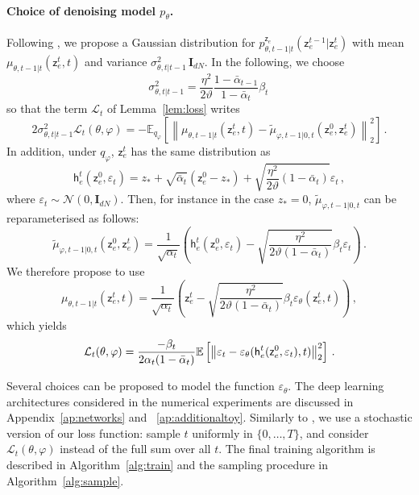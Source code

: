 \documentclass[nolayout]{article}
\theoremstyle{plain}
\theoremstyle{definition}
\theoremstyle{remark}
\newcommand{\latentcont}{\mathsf{z}_e}
\newcommand{\latentcontpred}{\mathsf{h}_e}
\begin{document}
\paragraph{Choice of denoising model $p_\theta$.}
Following \cite{ho2020denoising}, we propose a Gaussian distribution for $p_{\theta,t-1|t}^{\latentcont}(\latentcont^{t-1}|\latentcont^{t})$ with mean $\mu_{\theta,t-1|t}(\latentcont^{t},t)$ and variance $\sigma_{\theta,t|t-1}^2\,\mathbf{I}_{dN}$. In the following, we choose $$
\sigma_{\theta,t|t-1}^2 = \frac{\eta^2}{2\vartheta}\frac{1- \bar \alpha_{t-1}}{1- \bar \alpha_{t}}\beta_t\,
$$
so that the term $\mathcal{L}_t$ of Lemma~\ref{lem:loss} writes
$$
    2\sigma_{\theta,t|t-1}^2\mathcal{L}_t(\theta,\varphi)   = -\mathbb{E}_{q_\varphi}\left[\left\|\mu_{\theta,t-1|t}(\latentcont^{t},t) -  \tilde \mu_{\varphi,t-1|0,t}(\latentcont^0,\latentcont^t)\right\|_2^2\right]\,.
$$
In addition, under $q_\varphi$, $\latentcont^t$ has the same distribution as
$$
\latentcontpred^t(\latentcont^{0},\varepsilon_t) = z_* + \sqrt{\bar \alpha_t}(\latentcont^{0}-z_*) + \sqrt{\frac{\eta^2}{2\vartheta}(1-\bar\alpha_t)}\varepsilon_t\,,
$$
where $\varepsilon_t \sim \mathcal{N}(0,\mathbf{I}_{dN})$. Then, for instance in the case $z_*=0$, $\tilde \mu_{\varphi,t-1|0,t}$ can be reparameterised as follows:
$$
    \tilde \mu_{\varphi,t-1|0,t}(\latentcont^0,\latentcont^t) =  \frac{1}{\sqrt{\alpha_t}}\left(\latentcontpred^t(\latentcont^0,\varepsilon_t) - \sqrt{\frac{\eta^2}{2\vartheta (1-\bar{\alpha}_t)}}\beta_t\varepsilon_t\right)\,.
$$
We therefore propose to use
$$
    \mu_{\theta,t-1|t}(\latentcont^{t},t) =
     \frac{1}{\sqrt{\alpha_t}}\left(\latentcont^t - \sqrt{\frac{\eta^2}{2\vartheta (1-\bar{\alpha}_t)}}\beta_t\varepsilon_\theta(\latentcont^{t},t)\right)\,,
$$
which yields
\begin{equation}
    \label{eq:hoparam}
    \mathcal{L}_t(\theta,\varphi) \\
    = \frac{-\beta_t}{2\alpha_t(1-\bar\alpha_t)}\mathbb{E}\left[\left\|\varepsilon_t - \varepsilon_\theta(\latentcontpred^t(\latentcont^{0},\varepsilon_t) ,t) \right\|_2^2\right]\,.
\end{equation}
    
Several choices can be proposed to model the function $\varepsilon_\theta$. The deep learning architectures considered in the numerical experiments are discussed in Appendix~\ref{ap:networks} and ~\ref{ap:additionaltoy}. Similarly to \cite{ho2020denoising}, we use a stochastic version of our loss function:  sample $t$ uniformly in $\{0, \ldots,  T\}$, and consider $\mathcal{L}_t(\theta,\varphi)$ instead of the full sum over all $t$. The final training algorithm is described in Algorithm~\ref{alg:train} and the sampling procedure in Algorithm~\ref{alg:sample}. 
\end{document}
